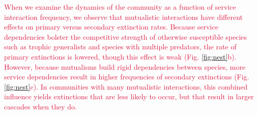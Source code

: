 \documentclass[twocolumn,preprintnumbers,amsmath,amssymb,superscriptaddress,linenumbers]{revtex4-1}
\newcommand{\rev}[1]{\textcolor{crimson}{#1}}
\begin{document}
\rev{When we examine the dynamics of the community as a function of service interaction frequency, we observe that mutualistic interactions have different effects on primary versus secondary extinction rates.
Because service dependencies bolster the competitive strength of otherwise susceptible species such as trophic generalists and species with multiple predators, the rate of primary extinctions is lowered, though this effect is weak (Fig. \ref{fig:nest}b).
However, because mutualisms build rigid dependencies between species, more service dependencies result in higher frequencies of secondary extinctions (Fig. \ref{fig:nest}c). 
In communities with many mutualistic interactions, this combined influence yields extinctions that are less likely to occur, but that result in larger cascades when they do.
}

% 
\end{document}
